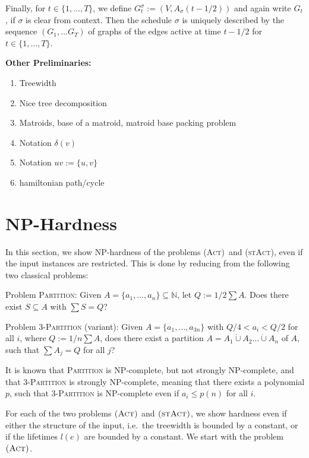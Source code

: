 \documentclass[10pt,a4paper]{article}
\numberwithin{equation}{section}
\newcommand{\N}{\mathbb{N}}
\newcommand{\set}[1]{\{ #1 \}}
\newcommand{\fromto}[2]{\set{#1, \ldots, #2}}
\newcommand{\dotunion}{\mathbin{\dot{\cup}}}
\newcommand{\act}{\textsc{(Act)}}
\newcommand{\stact}{\textsc{(stAct)}}
\begin{document}
Finally, for $t \in \fromto{1}{T}$, we define $G_t^\sigma := (V, A_\sigma(t - 1/2))$ and again write $G_t$, if $\sigma$ is clear from context. Then the schedule $\sigma$ is uniquely described by the sequence $(G_1, \dots G_T)$ of graphs of the edges active at time $t - 1/2$ for $t \in \fromto{1}{T}$.

\textbf{ Other Preliminaries: }
\begin{enumerate}
\item Treewidth
\item Nice tree decomposition
\item Matroids, base of a matroid, matroid base packing problem
\item Notation $\delta(v)$
\item Notation $uv := \set{u, v}$
\item hamiltonian path/cycle
\end{enumerate}

\section{NP-Hardness}

In this section, we show NP-hardness of the problems \act\ and \stact, even if the input instances are restricted. This is done by reducing from the following two classical problems:

\vspace*{0.2cm}

Problem \textsc{Partition}: Given $A = \set{a_1, \ldots, a_n} \subseteq \N$, let $Q := 1/2 \sum A$. Does there exist $S \subseteq A$ with $\sum S = Q$?

\vspace*{0.2cm}

Problem \textsc{3-Partition} (variant): Given $A = \set{a_1, \ldots, a_{3n}}$ with $Q/4 < a_i < Q/2$ for all $i$, where $Q := 1/n \sum A$, does there exist a partition $A = A_1 \dotunion A_2 \ldots \dotunion A_n$ of $A$, such that $\sum A_j = Q$ for all $j$?

\vspace*{0.2cm}

It is known that \textsc{Partition} is NP-complete, but not strongly NP-complete, and that \textsc{3-Partition} is strongly NP-complete, meaning that there exists a polynomial $p$, such that \textsc{3-Partition} is NP-complete even if $a_i \leq p(n)$ for all $i$.

For each of the two problems $\act$ and $\stact$, we show hardness even if either the structure of the input, i.e.\ the treewidth is bounded by a constant, or if the lifetimes $l(e)$ are bounded by a constant. We start with the problem $\act$.
\end{document}

